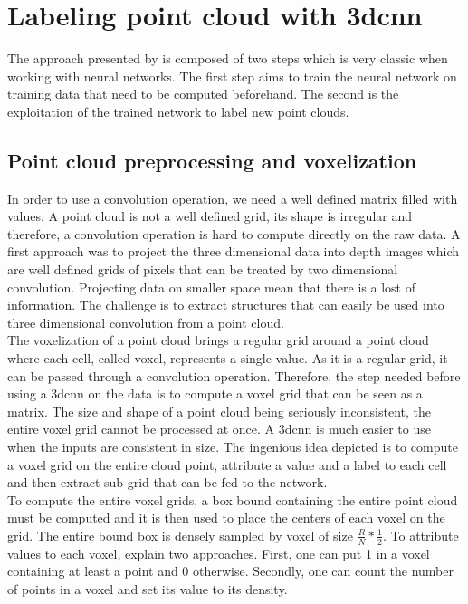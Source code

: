 \section{Labeling point cloud with \gls{3dcnn}}
\label{sec:summary}

The approach presented by \citeauthor*{7900038} is composed of two steps which is very classic when working with neural networks. The first step aims to train the neural network on training data that need to be computed beforehand. The second is the exploitation of the trained network to label new point clouds.

\subsection{Point cloud preprocessing and voxelization}

In order to use a convolution operation, we need a well defined matrix filled with values. A point cloud is not a well defined grid, its shape is irregular and therefore, a convolution operation is hard to compute directly on the raw data. A first approach was to project the three dimensional data into depth images which are well defined grids of pixels that can be treated by two dimensional convolution. Projecting data on smaller space mean that there is a lost of information. The challenge is to extract structures that can easily be used into three dimensional convolution from a point cloud.\\

The voxelization of a point cloud brings a regular grid around a point cloud where each cell, called voxel, represents a single value. As it is a regular grid, it can be passed through a convolution operation. Therefore, the step needed before using a \gls{3dcnn} on the data is to compute a voxel grid that can be seen as a matrix. The size and shape of a point cloud being seriously inconsistent, the entire voxel grid cannot be processed at once. A \gls{3dcnn} is much easier to use when the inputs are consistent in size. The ingenious idea depicted \cite{7900038} is to compute a voxel grid on the entire cloud point, attribute a value and a label to each cell and then extract sub-grid that can be fed to the network.\\

To compute the entire voxel grids, a box bound containing the entire point cloud must be computed and it is then used to place the centers of each voxel on the grid. The entire bound box is densely sampled by voxel of size \(\frac{R}{N} * \frac{1}{2}\). To attribute values to each voxel, \citeauthor*{7900038} explain two approaches. First, one can put 1 in a voxel containing at least a point and 0 otherwise. Secondly, one can count the number of points in a voxel and set its value to its density.\\

